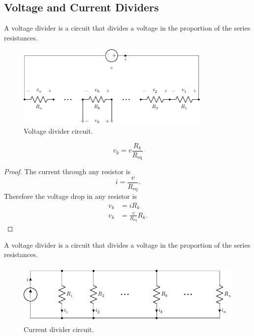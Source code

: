\documentclass{article}
\begin{document}
\subsection{Voltage and Current Dividers}
\begin{definition}
    A voltage divider is a circuit that divides a voltage in the proportion of the series resistances.
\end{definition}
\begin{figure}[H]
    \centering
    \includegraphics[height = 4cm, keepaspectratio = true]{figures/voltage_divider.pdf}
    \caption{Voltage divider circuit.}
\end{figure}
\begin{theorem}
    \begin{equation*}
        v_k = v \frac{R_k}{R_{\mathrm{eq}}}
    \end{equation*}
\end{theorem}
\begin{proof}
    The current through any resistor is
    \begin{equation*}
        i = \frac{v}{R_{\mathrm{eq}}}.
    \end{equation*}
    Therefore the voltage drop in any resistor is
    \begin{align*}
        v_k & = i R_k                          \\
        v_k & = \frac{v}{R_{\mathrm{eq}}} R_k.
    \end{align*}
\end{proof}
\begin{definition}
    A voltage divider is a circuit that divides a voltage in the proportion of the series resistances.
\end{definition}
\begin{figure}[H]
    \centering
    \includegraphics[height = 3cm, keepaspectratio = true]{figures/current_divider.pdf}
    \caption{Current divider circuit.}
\end{figure}
\end{document}
